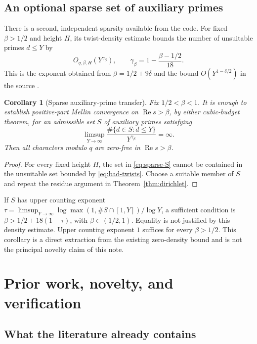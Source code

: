 \documentclass[11pt]{article}
\newtheorem{corollary}[theorem]{Corollary}
\theoremstyle{definition}
\newcommand{\Rea}{\operatorname{Re}}
\begin{document}
\subsection{An optional sparse set of auxiliary primes}

There is a second, independent sparsity available from the code. For
fixed \(\beta>1/2\) and height \(H\), its twist-density estimate bounds
the number of unsuitable primes \(d\leq Y\) by
\begin{equation}\label{eq:bad-twists}
 O_{q,\beta,H}\left(Y^{\gamma_\beta}\right),\qquad
 \gamma_\beta=1-\frac{\beta-1/2}{18}.
\end{equation}
This is the exponent obtained from \(\beta=1/2+9\delta\) and the
bound \(O(Y^{1-\delta/2})\) in the source \cite{twist}.

\begin{corollary}[Sparse auxiliary-prime transfer]\label{cor:sparse-d}
Fix \(1/2<\beta<1\). It is enough to establish positive-part Mellin
convergence on \(\Rea s>\beta\), by either cubic-budget theorem, for
an admissible set \(S\) of auxiliary primes satisfying
\begin{equation}\label{eq:sparse-S}
 \limsup_{Y\to\infty}
 \frac{\#\{d\in S:d\leq Y\}}{Y^{\gamma_\beta}}=\infty.
\end{equation}
Then all characters modulo \(q\) are zero-free in \(\Rea s>\beta\).
\end{corollary}
\begin{proof}
For every fixed height \(H\), the set in \eqref{eq:sparse-S} cannot
be contained in the unsuitable set bounded by \eqref{eq:bad-twists}.
Choose a suitable member of \(S\) and repeat the residue argument in
Theorem~\ref{thm:dirichlet}.
\end{proof}

If \(S\) has upper counting exponent
\(\tau=\limsup_{Y\to\infty}\log\max(1,\#S\cap[1,Y])/\log Y\), a
sufficient condition is
\(\beta>1/2+18(1-\tau)\), with \(\beta\in(1/2,1)\).
Equality is not justified by this density estimate. Upper counting
exponent \(1\) suffices for every \(\beta>1/2\). This corollary is a
direct extraction from the existing zero-density bound and is not the
principal novelty claim of this note.

\section{Prior work, novelty, and verification}
\label{sec:status}

\subsection{What the literature already contains}
\end{document}
